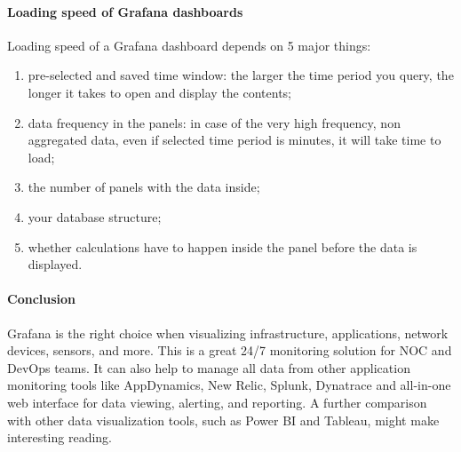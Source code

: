 \paragraph{Loading speed of Grafana dashboards}
Loading speed of a Grafana dashboard depends on 5 major things:
\begin{enumerate}
    \item  pre-selected and saved time window: the larger the time period you query, the longer it takes to open and display the contents;
    \item  data frequency in the panels: in case of the very high frequency, non aggregated data, even if selected time period is minutes, it will take time to load;
    \item  the number of panels with the data inside;
    \item  your database structure;
    \item  whether calculations have to happen inside the panel before the data is displayed.
\end{enumerate}

\paragraph{Conclusion}
Grafana is the right choice when  visualizing infrastructure, applications, network devices, sensors, and more. This is a great 24/7 monitoring solution for NOC and DevOps teams.
It can also help to manage all data from other application monitoring tools like AppDynamics, New Relic, Splunk, Dynatrace and all-in-one web interface for data viewing, alerting, and reporting.
A further comparison with other data visualization tools, such as Power BI and Tableau, might make interesting reading.




